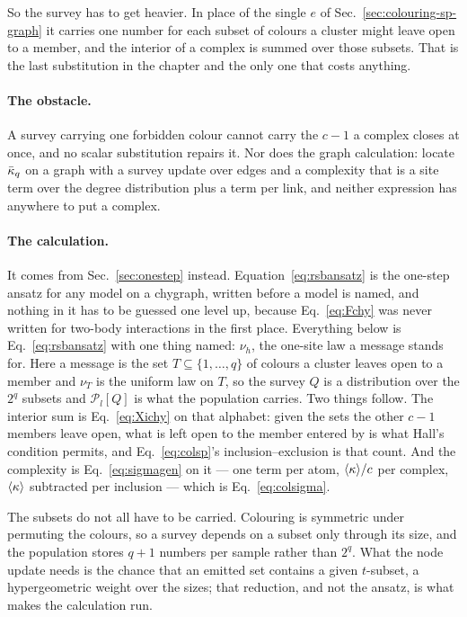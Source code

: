 So the survey has to get heavier. In place of the single $e$ of
Sec.~\ref{sec:colouring-sp-graph} it carries one number for each subset of colours a
cluster might leave open to a member, and the interior of a complex is summed
over those subsets. That is the last substitution in the chapter and the only
one that costs anything.

\paragraph{The obstacle.} A survey carrying one forbidden colour cannot carry
the $c-1$ a complex closes at once, and no scalar substitution repairs it. Nor
does the graph calculation: \citet{krzakala2004} locate $\bar\kappa_{q}$ on a graph with
a survey update over edges and a complexity that is a site term over the degree
distribution plus a term per link, and neither expression has anywhere to put a
complex.

\paragraph{The calculation.} It comes from Sec.~\ref{sec:onestep} instead.
Equation~\eqref{eq:rsbansatz} is the one-step ansatz for any model on a
chygraph, written before a model is named, and nothing in it has to be guessed
one level up, because Eq.~\eqref{eq:Fchy} was never written for two-body
interactions in the first place. Everything below is
Eq.~\eqref{eq:rsbansatz} with one thing named: $\nu_{h}$, the one-site law a
message stands for. Here a message is the set $T\subseteq\{1,\dots,q\}$ of
colours a cluster leaves open to a member and $\nu_{T}$ is the uniform law on
$T$, so the survey $Q$ is a distribution over the $2^{q}$ subsets and
$\mathcal{P}_{l}[Q]$ is what the population carries. Two things follow. The
interior sum is Eq.~\eqref{eq:Xichy} on that alphabet: given the sets the other
$c-1$ members leave open, what is left open to the member entered by is what
Hall's condition permits, and Eq.~\eqref{eq:colsp}'s inclusion--exclusion is
that count. And the complexity is Eq.~\eqref{eq:sigmagen} on it --- one term
per atom, $\langle \kappa \rangle/c$ per complex, $\langle \kappa \rangle$ subtracted per
inclusion --- which is Eq.~\eqref{eq:colsigma}.

The subsets do not all have to be carried. Colouring is symmetric under
permuting the colours, so a survey depends on a subset only through its size,
and the population stores $q+1$ numbers per sample rather than $2^{q}$. What
the node update needs is the chance that an emitted set contains a given
$t$-subset, a hypergeometric weight over the sizes; that reduction, and not the
ansatz, is what makes the calculation run.

